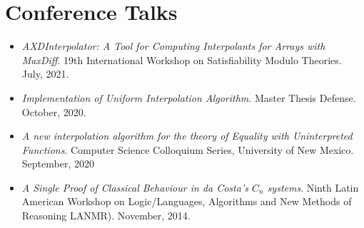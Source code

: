 \section{Conference Talks}

\begin{itemize}

  \item \emph{AXDInterpolator: A Tool for Computing Interpolants for Arrays with MaxDiff}. 19th International Workshop  on Satisfiability Modulo Theories. July, 2021.
  \item \emph{Implementation of Uniform Interpolation Algorithm}. Master Thesis Defense. October, 2020.
  \item \emph{A new interpolation algorithm for the theory of Equality with Uninterpreted Functions}. Computer Science Colloquium Series, University of New Mexico. September, 2020
  \item \emph{A Single Proof of Classical Behaviour in da Costa's $C_n$ systems}. Ninth Latin American Workshop on 
    Logic/Languages, Algorithms and New 
    Methods of Reasoning LANMR). November, 2014.
\end{itemize}
